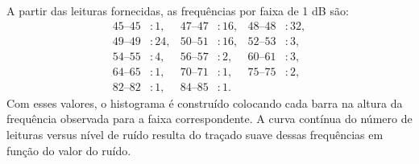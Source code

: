 A partir das leituras fornecidas, as frequências por faixa de 1 dB são:
\begin{align*}
45\text{–}45 &: 1, & 47\text{–}47 &: 16, & 48\text{–}48 &: 32,\\
49\text{–}49 &: 24, & 50\text{–}51 &: 16, & 52\text{–}53 &: 3,\\
54\text{–}55 &: 4, & 56\text{–}57 &: 2, & 60\text{–}61 &: 3,\\
64\text{–}65 &: 1, & 70\text{–}71 &: 1, & 75\text{–}75 &: 2,\\
82\text{–}82 &: 1, & 84\text{–}85 &: 1.
\end{align*}
Com esses valores, o histograma é construído colocando cada barra na altura da frequência observada para a faixa correspondente. A curva contínua do número de leituras versus nível de ruído resulta do traçado suave dessas frequências em função do valor do ruído.
 
